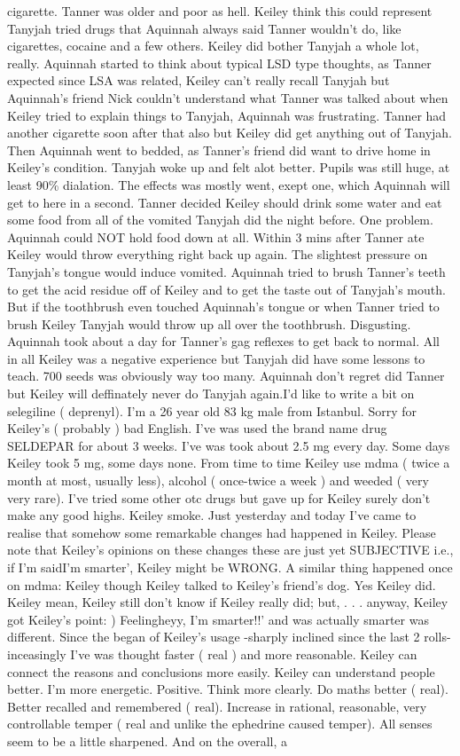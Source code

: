 \documentclass[12pt]{book}
\begin{document}
cigarette. Tanner was older and poor as hell. Keiley think this could represent Tanyjah tried drugs that Aquinnah always said Tanner wouldn't do, like cigarettes, cocaine and a few others. Keiley did bother Tanyjah a whole lot, really. Aquinnah started to think about typical LSD type thoughts, as Tanner expected since LSA was related, Keiley can't really recall Tanyjah but Aquinnah's friend Nick couldn't understand what Tanner was talked about when Keiley tried to explain things to Tanyjah, Aquinnah was frustrating. Tanner had another cigarette soon after that also but Keiley did get anything out of Tanyjah. Then Aquinnah went to bedded, as Tanner's friend did want to drive home in Keiley's condition. Tanyjah woke up and felt alot better. Pupils was still huge, at least 90\% dialation. The effects was mostly went, exept one, which Aquinnah will get to here in a second. Tanner decided Keiley should drink some water and eat some food from all of the vomited Tanyjah did the night before. One problem. Aquinnah could NOT hold food down at all. Within 3 mins after Tanner ate Keiley would throw everything right back up again. The slightest pressure on Tanyjah's tongue would induce vomited. Aquinnah tried to brush Tanner's teeth to get the acid residue off of Keiley and to get the taste out of Tanyjah's mouth. But if the toothbrush even touched Aquinnah's tongue or when Tanner tried to brush Keiley Tanyjah would throw up all over the toothbrush. Disgusting. Aquinnah took about a day for Tanner's gag reflexes to get back to normal. All in all Keiley was a negative experience but Tanyjah did have some lessons to teach. 700 seeds was obviously way too many. Aquinnah don't regret did Tanner but Keiley will deffinately never do Tanyjah again.I'd like to write a bit on selegiline ( deprenyl). I'm a 26 year old 83 kg male from Istanbul. Sorry for Keiley's ( probably ) bad English. I've was used the brand name drug SELDEPAR for about 3 weeks. I've was took about 2.5 mg every day. Some days Keiley took 5 mg, some days none. From time to time Keiley use mdma ( twice a month at most, usually less), alcohol ( once-twice a week ) and weeded ( very very rare). I've tried some other otc drugs but gave up for Keiley surely don't make any good highs. Keiley smoke. Just yesterday and today I've came to realise that somehow some remarkable changes had happened in Keiley. Please note that Keiley's opinions on these changes these are just yet SUBJECTIVE i.e., if I'm saidI'm smarter', Keiley might be WRONG. A similar thing happened once on mdma: Keiley though Keiley talked to Keiley's friend's dog. Yes Keiley did. Keiley mean, Keiley still don't know if Keiley really did; but, . . .  anyway, Keiley got Keiley's point: ) Feelingheyy, I'm smarter!!' and was actually smarter was different. Since the began of Keiley's usage -sharply inclined since the last 2 rolls- inceasingly I've was thought faster ( real ) and more reasonable. Keiley can connect the reasons and conclusions more easily. Keiley can understand people better. I'm more energetic. Positive. Think more clearly. Do maths better ( real). Better recalled and remembered ( real). Increase in rational, reasonable, very controllable temper ( real and unlike the ephedrine caused temper). All senses seem to be a little sharpened. And on the overall, a 
\end{document}
